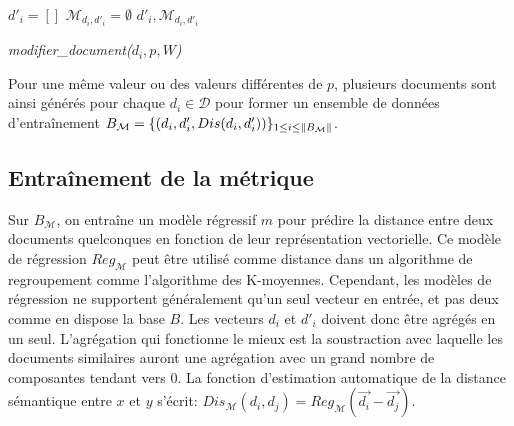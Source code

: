 \begin{algorithm}[!htb] %
 ${d'_i} = [] $\; 
 $\mathcal{M}_{d_i, d'_i} = \emptyset$\;
 \Return $d'_i, \mathcal{M}_{d_i, d'_i}$\;
 \caption{\textit{modifier\_document($d_i, p, W$)}} \label{algo:similarite:modifierdoc}
\end{algorithm}

Pour une même valeur ou des valeurs différentes de $p$, plusieurs documents sont ainsi générés pour chaque $d_i \in \mathcal{D}$ pour former un ensemble de données d'entraînement $B_\mathcal{M} = \lbrace (d_i, d'_i, {Dis}(d_i, d'_i))\rbrace_{1 \leq i \leq \left\lVert B_\mathcal{M}\right\rVert}$.

\subsection{Entraînement de la métrique}

Sur $B_\mathcal{M}$, on entraîne un modèle régressif $m$ pour prédire la distance entre deux documents quelconques en fonction de leur représentation vectorielle. Ce modèle de régression $Reg_\mathcal{M}$ peut être utilisé comme distance dans un algorithme de regroupement comme l'algorithme des K-moyennes. Cependant, les modèles de régression ne supportent généralement qu'un seul vecteur en entrée, et pas deux comme en dispose la base $B$. Les vecteurs $d_i$ et $d'_i$ doivent donc être agrégés en un seul. L'agrégation qui fonctionne le mieux est la soustraction avec laquelle les documents similaires auront une agrégation avec un grand nombre de composantes tendant vers 0. La fonction d'estimation automatique de la distance sémantique entre $x$ et $y$ s'écrit: $Dis_\mathcal{M}(d_i, d_j) = Reg_\mathcal{M}(\vec{d_{i}} - \vec{d_{j}})$. 

